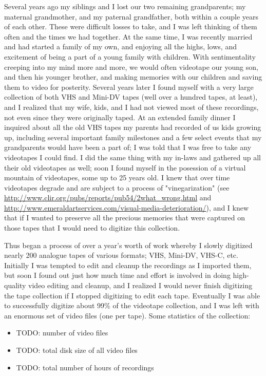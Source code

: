 Several years ago my siblings and I lost our two remaining grandparents; my maternal grandmother, and my paternal grandfather, both within a couple years of each other.  These were difficult losses to take, and I was left thinking of them often and the times we had together.  At the same time, I was recently married and had started a family of my own, and enjoying all the highs, lows, and excitement of being a part of a young family with children.  With sentimentality creeping into my mind more and more, we would often videotape our young son, and then his younger brother, and making memories with our children and saving them to video for posterity.  Several years later I found myself with a very large collection of both VHS and Mini-DV tapes (well over a hundred tapes, at least), and I realized that my wife, kids, and I had not viewed most of these recordings, not even since they were originally taped.  At an extended family dinner I inquired about all the old VHS tapes my parents had recorded of us kids growing up, including several important family milestones and a few select events that my grandparents would have been a part of; I was told that I was free to take any videotapes I could find.  I did the same thing with my in-laws and gathered up all their old videotapes as well; soon I found myself in the posession of a virtual mountain of videotapes, some up to 25 years old.  I knew that over time videotapes degrade and are subject to a process of "vinegarization" (see \url{http://www.clir.org/pubs/reports/pub54/2what_wrong.html} and \url{http://www.emeraldartservices.com/visual-media-deterioration/}), and I knew that if I wanted to preserve all the precious memories that were captured on those tapes that I would need to digitize this collection.

Thus began a process of over a year's worth of work whereby I slowly digitized nearly 200 analogue tapes of various formats; VHS, Mini-DV, VHS-C, etc.  Initially I was tempted to edit and cleanup the recordings as I imported them, but soon I found out just how much time and effort is involved in doing high-quality video editing and cleanup, and I realized I would never finish digitizing the tape collection if I stopped digitizing to edit each tape.  Eventually I was able to successfully digitize about 99\% of the videotape collection, and I was left with an enormous set of video files (one per tape).  Some statistics of the collection:

\begin{itemize}
\item TODO: number of video files
\item TODO: total disk size of all video files
\item TODO: total number of hours of recordings
\end{itemize}

